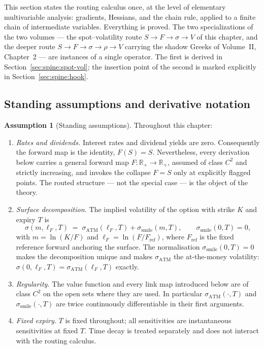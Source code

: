 \documentclass[11pt]{book}
\theoremstyle{plain}
\theoremstyle{definition}
\newtheorem{assumption}[theorem]{Assumption}
\theoremstyle{remark}
\newcommand{\mln}{m}                             %
\newcommand{\lF}{\ell_F}                         %
\newcommand{\Fref}{F_{\mathrm{ref}}}             %
\newcommand{\ssm}{\sigma_{\mathrm{smile}}}       %
\newcommand{\satm}{\sigma_{\mathrm{ATM}}}        %
\begin{document}
This section states the routing calculus once, at the level of elementary
multivariable analysis: gradients, Hessians, and the chain rule, applied to a
finite chain of intermediate variables. Everything is proved. The two
specializations of the two volumes --- the spot--volatility route
$S \to F \to \sigma \to V$ of this chapter, and the deeper route
$S \to F \to \sigma \to \rho \to V$ carrying the shadow Greeks of
Volume~II, Chapter~2 --- are instances of a single operator. The first is
derived in Section~\ref{sec:spine:spot-vol}; the insertion point of the second
is marked explicitly in Section~\ref{sec:spine:hook}.

\subsection{Standing assumptions and derivative notation}\label{sec:spine:assumptions}

\begin{assumption}[Standing assumptions]\label{ass:spine:standing}
Throughout this chapter:
\begin{enumerate}
  \item \emph{Rates and dividends.} Interest rates and dividend yields are
        zero. Consequently the forward map is the identity, $F(S) = S$.
        Nevertheless, every derivation below carries a general forward map
        $F \colon \mathbb{R}_+ \to \mathbb{R}_+$, assumed of class $C^2$ and
        strictly increasing, and invokes the collapse $F = S$ only at
        explicitly flagged points. The routed structure --- not the special
        case --- is the object of the theory.
  \item \emph{Surface decomposition.} The implied volatility of the option
        with strike $K$ and expiry $T$ is
        \begin{equation}\label{eq:spine:decomp}
          \sigma(\mln, \lF, T) \;=\; \satm(\lF, T) + \ssm(\mln, T),
          \qquad \ssm(0, T) = 0,
        \end{equation}
        with $\mln = \ln(K/F)$ and $\lF = \ln(F/\Fref)$, where $\Fref$ is the
        fixed reference forward anchoring the surface. The normalisation
        $\ssm(0,T) = 0$ makes the decomposition unique and makes $\satm$ the
        at-the-money volatility: $\sigma(0, \lF, T) = \satm(\lF, T)$ exactly.
  \item \emph{Regularity.} The value function and every link map introduced
        below are of class $C^2$ on the open sets where they are used. In
        particular $\satm(\cdot, T)$ and $\ssm(\cdot, T)$ are twice
        continuously differentiable in their first arguments.
  \item \emph{Fixed expiry.} $T$ is fixed throughout; all sensitivities are
        instantaneous sensitivities at fixed $T$. Time decay is treated
        separately and does not interact with the routing calculus.
\end{enumerate}
\end{assumption}
\end{document}
